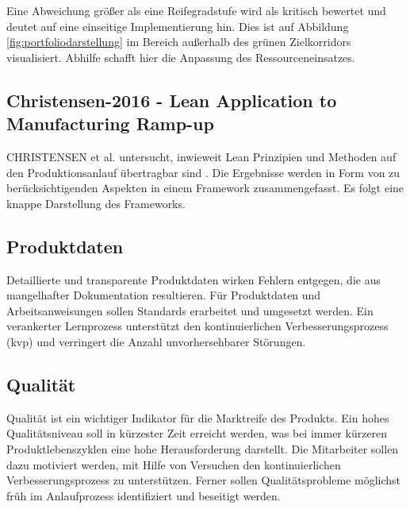 Eine Abweichung größer als eine Reifegradstufe wird als kritisch bewertet und deutet auf eine einseitige Implementierung hin. Dies ist auf Abbildung \ref{fig:portfoliodarstellung} im Bereich außerhalb des grünen Zielkorridors visualisiert.  Abhilfe schafft hier die Anpassung des Ressourceneinsatzes. 


\subsection*{Christensen-2016 - Lean Application to Manufacturing Ramp-up}\label{sec:christensen}
CHRISTENSEN et al. untersucht, inwieweit Lean Prinzipien und Methoden auf den Produktionsanlauf übertragbar sind \cite{Christensen2016}. 
Die Ergebnisse werden in Form von zu berücksichtigenden Aspekten in einem Framework zusammengefasst. Es folgt eine knappe Darstellung des Frameworks. 

\subsection*{Produktdaten}
Detaillierte und transparente Produktdaten wirken Fehlern entgegen, die aus mangelhafter Dokumentation resultieren. 
Für Produktdaten und Arbeitsanweisungen sollen Standards erarbeitet und umgesetzt werden. Ein verankerter Lernprozess unterstützt den kontinuierlichen Verbesserungsprozess (\gls{kvp}) und verringert die Anzahl unvorhersehbarer Störungen. 


\subsection*{Qualität}
Qualität ist ein wichtiger Indikator für die Marktreife des Produkts. Ein hohes Qualitätsniveau soll in kürzester Zeit erreicht werden, was bei immer kürzeren Produktlebenszyklen eine hohe Herausforderung darstellt. 
%
Die Mitarbeiter sollen dazu motiviert werden, mit Hilfe von Versuchen den kontinuierlichen Verbesserungsprozess zu unterstützen. Ferner sollen Qualitätsprobleme möglichst früh im Anlaufprozess identifiziert und beseitigt werden. 

